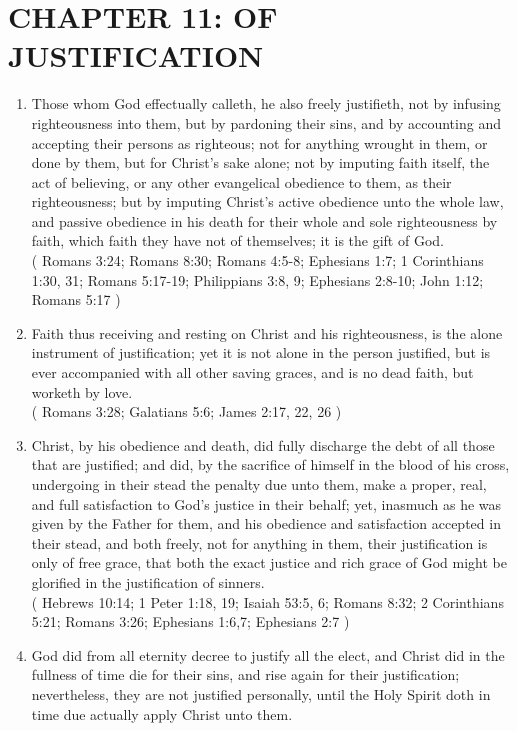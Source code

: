 \documentclass[12pt,a4paper]{book}
\begin{document}
\chapter{CHAPTER 11: OF JUSTIFICATION}
\label{ch-justif}
\begin{enumerate}
\item Those whom God effectually calleth, he also freely justifieth, not by infusing righteousness into them, but by pardoning their sins, and by accounting and accepting their persons as righteous; not for anything wrought in them, or done by them, but for Christ's sake alone; not by imputing faith itself, the act of believing, or any other evangelical obedience to them, as their righteousness; but by imputing Christ's active obedience unto the whole law, and passive obedience in his death for their whole and sole righteousness by faith, which faith they have not of themselves; it is the gift of God.\\
( Romans 3:24; Romans 8:30; Romans 4:5-8; Ephesians 1:7; 1 Corinthians 1:30, 31; Romans 5:17-19; Philippians 3:8, 9; Ephesians 2:8-10; John 1:12; Romans 5:17 )
\item Faith thus receiving and resting on Christ and his righteousness, is the alone instrument of justification; yet it is not alone in the person justified, but is ever accompanied with all other saving graces, and is no dead faith, but worketh by love.\\
( Romans 3:28; Galatians 5:6; James 2:17, 22, 26 )
\item Christ, by his obedience and death, did fully discharge the debt of all those that are justified; and did, by the sacrifice of himself in the blood of his cross, undergoing in their stead the penalty due unto them, make a proper, real, and full satisfaction to God's justice in their behalf; yet, inasmuch as he was given by the Father for them, and his obedience and satisfaction accepted in their stead, and both freely, not for anything in them, their justification is only of free grace, that both the exact justice and rich grace of God might be glorified in the justification of sinners.\\
( Hebrews 10:14; 1 Peter 1:18, 19; Isaiah 53:5, 6; Romans 8:32; 2 Corinthians 5:21; Romans 3:26; Ephesians 1:6,7; Ephesians 2:7 )
\item God did from all eternity decree to justify all the elect, and Christ did in the fullness of time die for their sins, and rise again for their justification; nevertheless, they are not justified personally, until the Holy Spirit doth in time due actually apply Christ unto them.\\

\end{enumerate}
\end{document}
